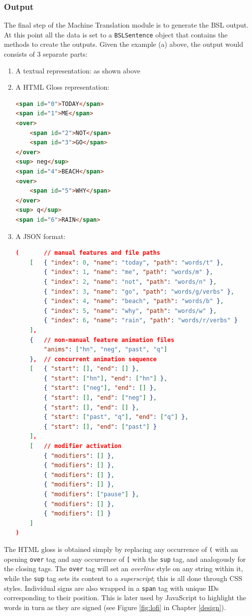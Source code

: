 \documentclass[12pt]{ociamthesis}  %
\begin{document}
\subsubsection{Output}
\label{output}
The final step of the Machine Translation module is to generate the BSL output. At this point all the data is set to a \texttt{BSLSentence} object that contains the methods to create the outputs. Given the example (a) above, the output would consists of 3 separate parts:
\begin{enumerate}
	\item A textual representation: as shown above
	\item A HTML Gloss representation: 
	\begin{lstlisting}[language=HTML, caption = Gloss HTML format]
<span id="0">TODAY</span> 
<span id="1">ME</span> 
<over>
	<span id="2">NOT</span> 
	<span id="3">GO</span>
</over>
<sup> neg</sup> 
<span id="4">BEACH</span>
<over>
	<span id="5">WHY</span>
</over>
<sup> q</sup> 
<span id="6">RAIN</span>
\end{lstlisting}
	\item A JSON format:
	\begin{lstlisting}[language=json, caption = JSON format, label = lst:jsonformat]
(		// manual features and file paths
	[	{ "index": 0, "name": "today", "path": "words/t" },
		{ "index": 1, "name": "me", "path": "words/m" },
		{ "index": 2, "name": "not", "path": "words/n" },
		{ "index": 3, "name": "go", "path": "words/g/verbs" },
		{ "index": 4, "name": "beach", "path": "words/b" },
		{ "index": 5, "name": "why", "path": "words/w" },
		{ "index": 6, "name": "rain", "path": "words/r/verbs" }
	],
	{ 	// non-manual feature animation files
		"anims": ["hn", "neg", "past", "q"] 
	},	// concurrent animation sequence
	[	{ "start": [], "end": [] },
		{ "start": ["hn"], "end": ["hn"] },
		{ "start": ["neg"], "end": [] },
		{ "start": [], "end": ["neg"] },
		{ "start": [], "end": [] },
		{ "start": ["past", "q"], "end": ["q"] },
		{ "start": [], "end": ["past"] }
	],
	[	// modifier activation 
		{ "modifiers": [] }, 
		{ "modifiers": [] }, 
		{ "modifiers": [] }, 
		{ "modifiers": [] }, 
		{ "modifiers": ["pause"] }, 
		{ "modifiers": [] }, 
		{ "modifiers": [] }
	]
)
\end{lstlisting}
\end{enumerate}
The HTML gloss is obtained simply by replacing any occurrence of \texttt{(} with an opening \texttt{over} tag and any occurrence of \texttt{[} with the \texttt{sup} tag, and analogously for the closing tags. The \texttt{over} tag will set an \textit{overline} style on any string within it, while the \texttt{sup} tag sets its content to a \textit{superscript}; this is all done through CSS styles. Individual signs are also wrapped in a \texttt{span} tag with unique IDs corresponding to their position. This is later used by JavaScript to highlight the words in turn as they are signed (see Figure \ref{fig:lofi} in Chapter \ref{design}).
\end{document}
